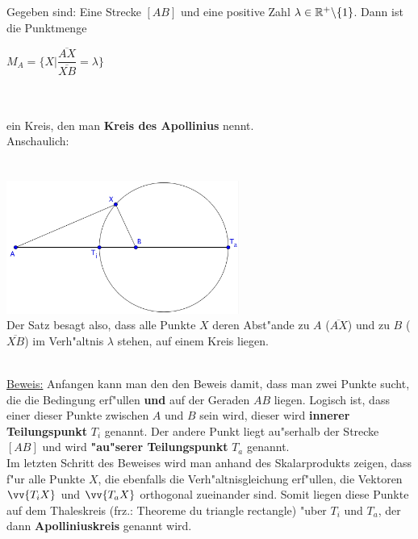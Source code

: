 \begin{small}

\begin{Definition}
Gegeben sind: Eine Strecke $[AB]$ und eine positive Zahl $\lambda \in \mathbb{R}^{+} \backslash \{1\}$. Dann ist die Punktmenge

\begin{center}
$M_{A}=\{X| \dfrac{\overline{AX}} {\overline{XB}}=\lambda \}$\\
\end{center}
\\
\\
ein Kreis, den man \textbf{Kreis des Apollinius} nennt.\\
Anschaulich:\\
\\
\\
\includegraphics[width=3in]{kap5/Apollinus_anschaulich}
\\
Der Satz besagt also, dass alle Punkte $X$ deren Abst"ande zu $A$ ($\overline{AX}$) und zu $B$ ($\overline{XB}$) im Verh"altnis $\lambda$ stehen, auf einem Kreis liegen.\\
\end{Definition}
\newline

\begin{Beweis}
\\
\underline{Beweis:}
Anfangen kann man den den Beweis damit, dass man zwei Punkte sucht, die die Bedingung erf"ullen \textbf{und} auf der Geraden $AB$ liegen. Logisch ist, dass einer dieser Punkte zwischen $A$ und $B$ sein wird, dieser wird \textbf{innerer Teilungspunkt} $T_{i}$ genannt. Der andere Punkt liegt au"serhalb der Strecke $[AB]$ und wird \textbf{"au"serer Teilungspunkt} $T_{a}$ genannt. \\
Im letzten Schritt des Beweises wird man anhand des Skalarprodukts zeigen, dass f"ur alle Punkte $X$, die ebenfalls die Verh"altnisgleichung erf"ullen, die Vektoren $\vv{T_{i}X}$ und $\vv{T_{a}X}$ orthogonal zueinander sind. Somit liegen diese Punkte auf dem Thaleskreis (frz.: Theoreme du triangle rectangle) "uber $T_{i}$ und $T_{a}$, der dann \textbf{Apolliniuskreis} genannt wird.\\
\begin{enumerate}



\end{enumerate}
\end{Beweis}
\end{small}
